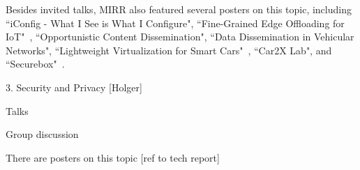 Besides invited talks, MIRR also featured several posters on this topic, including
``iConfig - What I See is What I Configure", 
``Fine-Grained Edge Offloading for IoT"~\cite{cozzolino:hotconnet:2017},
``Opportunistic Content Dissemination",
``Data Dissemination in Vehicular Networks",
``Lightweight Virtualization for Smart Cars"~\cite{rmorabito:im:2017},
``Car2X Lab", and ``Securebox"~\cite{hafeez:can:2016}.


3. Security and Privacy [Holger]

Talks

Group discussion

There are posters on this topic [ref to tech report]
